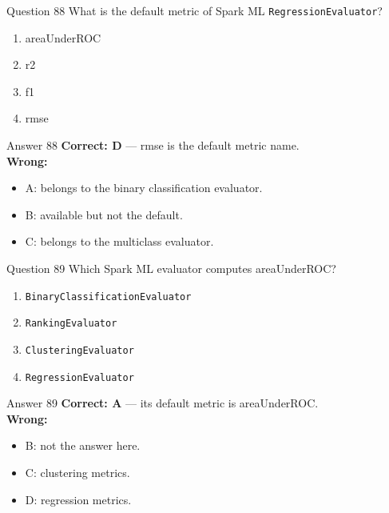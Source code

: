 \documentclass[aspectratio=169,11pt]{beamer}
\begin{document}
	\begin{frame}{Question 88}
		What is the default metric of Spark ML \texttt{RegressionEvaluator}?
		\begin{enumerate}[label=\Alph*.]
			\item areaUnderROC
			\item r2
			\item f1
			\item rmse
		\end{enumerate}
	\end{frame}
	\begin{frame}{Answer 88}
		\textbf{Correct: D} --- rmse is the default metric name.\\
		\vspace{0.5em}
		\textbf{Wrong:}
		\begin{itemize}
			\item A: belongs to the binary classification evaluator.
			\item B: available but not the default.
			\item C: belongs to the multiclass evaluator.
		\end{itemize}
	\end{frame}
	
	\begin{frame}{Question 89}
		Which Spark ML evaluator computes areaUnderROC?
		\begin{enumerate}[label=\Alph*.]
			\item \texttt{BinaryClassificationEvaluator}
			\item \texttt{RankingEvaluator}
			\item \texttt{ClusteringEvaluator}
			\item \texttt{RegressionEvaluator}
		\end{enumerate}
	\end{frame}
	\begin{frame}{Answer 89}
		\textbf{Correct: A} --- its default metric is areaUnderROC.\\
		\vspace{0.5em}
		\textbf{Wrong:}
		\begin{itemize}
			\item B: not the answer here.
			\item C: clustering metrics.
			\item D: regression metrics.
		\end{itemize}
	\end{frame}
	
\end{document}
